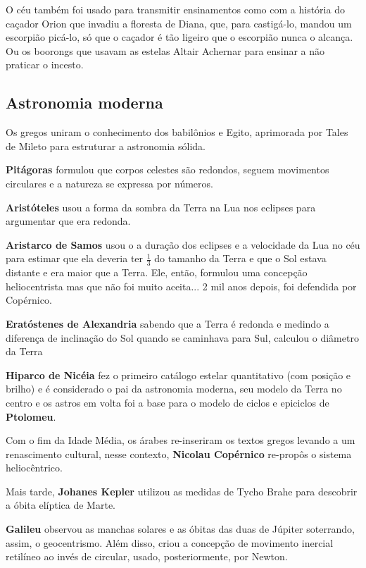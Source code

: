 \documentclass{article}
\begin{document}
O céu também foi usado para transmitir ensinamentos como com a história 
do caçador Orion que invadiu a floresta de Diana, que, para castigá-lo,
mandou um escorpião picá-lo, só que o caçador é tão ligeiro que o 
escorpião nunca o alcança. Ou os boorongs que usavam as estelas Altair 
Achernar para ensinar a não praticar o incesto. 

\subsection{Astronomia moderna}

Os gregos uniram o conhecimento dos babilônios e Egito, aprimorada 
por Tales de Mileto para estruturar a astronomia sólida.

\textbf{Pitágoras} formulou que corpos celestes são redondos, seguem movimentos
circulares e a natureza se expressa por números.

\textbf{Aristóteles} usou a forma da sombra da Terra na Lua nos eclipses para
argumentar que era redonda.

\textbf{Aristarco de Samos} usou o a duração dos eclipses e a velocidade da 
Lua no céu para estimar que ela deveria ter $\frac{1}{3}$ do tamanho
da Terra e que o Sol estava distante e era maior que a Terra. Ele, 
então, formulou uma concepção heliocentrista mas que não foi muito 
aceita... 2 mil anos depois, foi defendida por Copérnico.

\textbf{Eratóstenes de Alexandria} sabendo que a Terra é redonda e medindo 
a diferença de inclinação do Sol quando se caminhava para Sul, 
calculou o diâmetro da Terra

\textbf{Hiparco de Nicéia} fez o primeiro catálogo estelar quantitativo (com
posição e brilho) e é considerado o pai da astronomia moderna, seu
modelo da Terra no centro e os astros em volta foi a base para o 
modelo de ciclos e epiciclos de \textbf{Ptolomeu}.

Com o fim da Idade Média, os árabes re-inseriram os textos gregos 
levando a um renascimento cultural, nesse contexto, \textbf{Nicolau Copérnico }
re-propôs o sistema heliocêntrico.

Mais tarde, \textbf{Johanes Kepler} utilizou as medidas de Tycho Brahe para 
descobrir a óbita elíptica de Marte.

\textbf{Galileu} observou as manchas solares e as óbitas das duas de Júpiter 
soterrando, assim, o geocentrismo. Além disso, criou a concepção de 
movimento inercial retilíneo ao invés de circular, usado, posteriormente,
por Newton.
\end{document}
